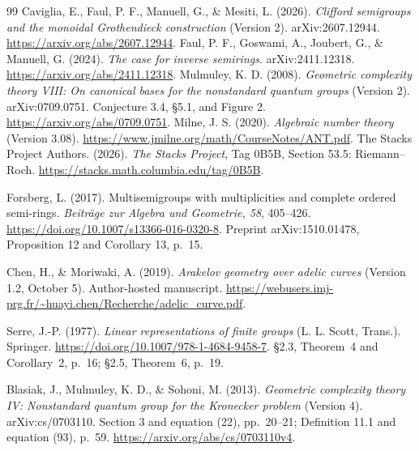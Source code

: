 \documentclass[11pt]{article}
\theoremstyle{definition}\newtheorem{definition}[theorem]{Definition}
\begin{document}
\begin{thebibliography}{99}
 Caviglia, E., Faul, P. F., Manuell, G., \& Mesiti, L. (2026). \emph{Clifford semigroups and the monoidal Grothendieck construction} (Version 2). arXiv:2607.12944. \url{https://arxiv.org/abs/2607.12944}.
 Faul, P. F., Goswami, A., Joubert, G., \& Manuell, G. (2024). \emph{The case for inverse semirings}. arXiv:2411.12318. \url{https://arxiv.org/abs/2411.12318}.
 Mulmuley, K. D. (2008). \emph{Geometric complexity theory VIII: On canonical bases for the nonstandard quantum groups} (Version 2). arXiv:0709.0751. Conjecture 3.4, \S5.1, and Figure 2. \url{https://arxiv.org/abs/0709.0751}.
Milne, J. S. (2020). \emph{Algebraic number theory} (Version 3.08).
\url{https://www.jmilne.org/math/CourseNotes/ANT.pdf}.
The Stacks Project Authors. (2026). \emph{The Stacks Project}, Tag 0B5B,
Section 53.5: Riemann--Roch.
\url{https://stacks.math.columbia.edu/tag/0B5B}.


Forsberg, L. (2017). Multisemigroups with multiplicities and complete ordered semi-rings. \emph{Beitr\"age zur Algebra und Geometrie, 58}, 405--426. \url{https://doi.org/10.1007/s13366-016-0320-8}. Preprint arXiv:1510.01478, Proposition 12 and Corollary 13, p.\ 15.

Chen, H., \& Moriwaki, A. (2019). \emph{Arakelov geometry over adelic curves}
(Version 1.2, October 5). Author-hosted manuscript.
\url{https://webusers.imj-prg.fr/~huayi.chen/Recherche/adelic_curve.pdf}.

Serre, J.-P. (1977). \emph{Linear representations of finite groups}
(L. L. Scott, Trans.). Springer.
\url{https://doi.org/10.1007/978-1-4684-9458-7}.
\S2.3, Theorem~4 and Corollary~2, p.~16; \S2.5, Theorem~6, p.~19.

Blasiak, J., Mulmuley, K. D., \& Sohoni, M. (2013).
\emph{Geometric complexity theory IV: Nonstandard quantum group for the Kronecker problem} (Version 4).
arXiv:cs/0703110. Section 3 and equation (22), pp.\ 20--21; Definition 11.1 and equation (93), p.\ 59.
\url{https://arxiv.org/abs/cs/0703110v4}.

\end{thebibliography}
\end{document}
